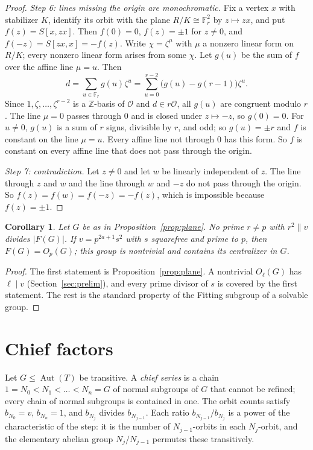 \documentclass[11pt]{amsart}
\newtheorem{corollary}[theorem]{Corollary}
\theoremstyle{definition}
\theoremstyle{remark}
\newcommand{\Z}{\mathbb{Z}}
\newcommand{\F}{\mathbb{F}}
\newcommand{\cO}{\mathcal{O}}
\newcommand{\Aut}{\operatorname{Aut}}
\begin{document}
\begin{proof}
\emph{Step 6: lines missing the origin are monochromatic.} Fix a vertex $x$ with stabilizer $K$, identify its orbit with the plane $R/K\cong\F_r^2$ by $z\mapsto zx$, and put $f(z)=S[x,zx]$. Then $f(0)=0$, $f(z)=\pm1$ for $z\ne0$, and $f(-z)=S[zx,x]=-f(z)$. Write $\chi=\zeta^{\mu}$ with $\mu$ a nonzero linear form on $R/K$; every nonzero linear form arises from some $\chi$. Let $g(u)$ be the sum of $f$ over the affine line $\mu=u$. Then
\[
d=\sum_{u\in\F_r}g(u)\zeta^u=\sum_{u=0}^{r-2}\bigl(g(u)-g(r-1)\bigr)\zeta^u .
\]
Since $1,\zeta,\dots,\zeta^{r-2}$ is a $\Z$-basis of $\cO$ and $d\in r\cO$, all $g(u)$ are congruent modulo $r$. The line $\mu=0$ passes through $0$ and is closed under $z\mapsto-z$, so $g(0)=0$. For $u\ne0$, $g(u)$ is a sum of $r$ signs, divisible by $r$, and odd; so $g(u)=\pm r$ and $f$ is constant on the line $\mu=u$. Every affine line not through $0$ has this form. So $f$ is constant on every affine line that does not pass through the origin.

\emph{Step 7: contradiction.} Let $z\ne0$ and let $w$ be linearly independent of $z$. The line through $z$ and $w$ and the line through $w$ and $-z$ do not pass through the origin. So $f(z)=f(w)=f(-z)=-f(z)$, which is impossible because $f(z)=\pm1$.
\end{proof}

\begin{corollary}\label{cor:fitting}
Let $G$ be as in Proposition~\ref{prop:plane}. No prime $r\ne p$ with $r^2\parallel v$ divides $|F(G)|$. If $v=p^{2a+1}s^2$ with $s$ squarefree and prime to $p$, then $F(G)=O_p(G)$; this group is nontrivial and contains its centralizer in $G$.
\end{corollary}
\begin{proof}
The first statement is Proposition~\ref{prop:plane}. A nontrivial $O_\ell(G)$ has $\ell\mid v$ (Section~\ref{sec:prelim}), and every prime divisor of $s$ is covered by the first statement. The rest is the standard property of the Fitting subgroup of a solvable group.
\end{proof}

\section{Chief factors}\label{sec:divisor}

Let $G\le\Aut(T)$ be transitive. A \emph{chief series} is a chain $1=N_0<N_1<\dots<N_n=G$ of normal subgroups of $G$ that cannot be refined; every chain of normal subgroups is contained in one. The orbit counts satisfy $b_{N_0}=v$, $b_{N_n}=1$, and $b_{N_j}$ divides $b_{N_{j-1}}$. Each ratio $b_{N_{j-1}}/b_{N_j}$ is a power of the characteristic of the step: it is the number of $N_{j-1}$-orbits in each $N_j$-orbit, and the elementary abelian group $N_j/N_{j-1}$ permutes these transitively.
\end{document}
